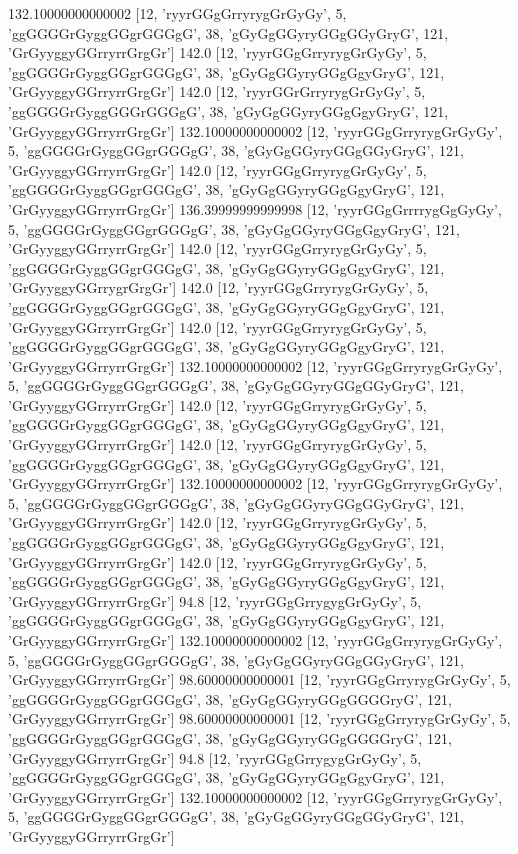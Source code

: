 132.10000000000002 [12, 'ryyrGGgGrryrygGrGyGy', 5, 'ggGGGGrGyggGGgrGGGgG', 38, 'gGyGgGGyryGGgGGyGryG', 121, 'GrGyyggyGGrryrrGrgGr']
142.0 [12, 'ryyrGGgGrryrygGrGyGy', 5, 'ggGGGGrGyggGGgrGGGgG', 38, 'gGyGgGGyryGGgGgyGryG', 121, 'GrGyyggyGGrryrrGrgGr']
142.0 [12, 'ryyrGGrGrryrygGrGyGy', 5, 'ggGGGGrGyggGGGrGGGgG', 38, 'gGyGgGGyryGGgGgyGryG', 121, 'GrGyyggyGGrryrrGrgGr']
132.10000000000002 [12, 'ryyrGGgGrryrygGrGyGy', 5, 'ggGGGGrGyggGGgrGGGgG', 38, 'gGyGgGGyryGGgGGyGryG', 121, 'GrGyyggyGGrryrrGrgGr']
142.0 [12, 'ryyrGGgGrryrygGrGyGy', 5, 'ggGGGGrGyggGGgrGGGgG', 38, 'gGyGgGGyryGGgGgyGryG', 121, 'GrGyyggyGGrryrrGrgGr']
136.39999999999998 [12, 'ryyrGGgGrrrrygGgGyGy', 5, 'ggGGGGrGyggGGgrGGGgG', 38, 'gGyGgGGyryGGgGgyGryG', 121, 'GrGyyggyGGrryrrGrgGr']
142.0 [12, 'ryyrGGgGrryrygGrGyGy', 5, 'ggGGGGrGyggGGgrGGGgG', 38, 'gGyGgGGyryGGgGgyGryG', 121, 'GrGyyggyGGrrygrGrgGr']
142.0 [12, 'ryyrGGgGrryrygGrGyGy', 5, 'ggGGGGrGyggGGgrGGGgG', 38, 'gGyGgGGyryGGgGgyGryG', 121, 'GrGyyggyGGrryrrGrgGr']
142.0 [12, 'ryyrGGgGrryrygGrGyGy', 5, 'ggGGGGrGyggGGgrGGGgG', 38, 'gGyGgGGyryGGgGgyGryG', 121, 'GrGyyggyGGrryrrGrgGr']
132.10000000000002 [12, 'ryyrGGgGrryrygGrGyGy', 5, 'ggGGGGrGyggGGgrGGGgG', 38, 'gGyGgGGyryGGgGGyGryG', 121, 'GrGyyggyGGrryrrGrgGr']
142.0 [12, 'ryyrGGgGrryrygGrGyGy', 5, 'ggGGGGrGyggGGgrGGGgG', 38, 'gGyGgGGyryGGgGgyGryG', 121, 'GrGyyggyGGrryrrGrgGr']
142.0 [12, 'ryyrGGgGrryrygGrGyGy', 5, 'ggGGGGrGyggGGgrGGGgG', 38, 'gGyGgGGyryGGgGgyGryG', 121, 'GrGyyggyGGrryrrGrgGr']
132.10000000000002 [12, 'ryyrGGgGrryrygGrGyGy', 5, 'ggGGGGrGyggGGgrGGGgG', 38, 'gGyGgGGyryGGgGGyGryG', 121, 'GrGyyggyGGrryrrGrgGr']
142.0 [12, 'ryyrGGgGrryrygGrGyGy', 5, 'ggGGGGrGyggGGgrGGGgG', 38, 'gGyGgGGyryGGgGgyGryG', 121, 'GrGyyggyGGrryrrGrgGr']
142.0 [12, 'ryyrGGgGrryrygGrGyGy', 5, 'ggGGGGrGyggGGgrGGGgG', 38, 'gGyGgGGyryGGgGgyGryG', 121, 'GrGyyggyGGrryrrGrgGr']
94.8 [12, 'ryyrGGgGrrygygGrGyGy', 5, 'ggGGGGrGyggGGgrGGGgG', 38, 'gGyGgGGyryGGgGgyGryG', 121, 'GrGyyggyGGrryrrGrgGr']
132.10000000000002 [12, 'ryyrGGgGrryrygGrGyGy', 5, 'ggGGGGrGyggGGgrGGGgG', 38, 'gGyGgGGyryGGgGGyGryG', 121, 'GrGyyggyGGrryrrGrgGr']
98.60000000000001 [12, 'ryyrGGgGrryrygGrGyGy', 5, 'ggGGGGrGyggGGgrGGGgG', 38, 'gGyGgGGyryGGgGGGGryG', 121, 'GrGyyggyGGrryrrGrgGr']
98.60000000000001 [12, 'ryyrGGgGrryrygGrGyGy', 5, 'ggGGGGrGyggGGgrGGGgG', 38, 'gGyGgGGyryGGgGGGGryG', 121, 'GrGyyggyGGrryrrGrgGr']
94.8 [12, 'ryyrGGgGrrygygGrGyGy', 5, 'ggGGGGrGyggGGgrGGGgG', 38, 'gGyGgGGyryGGgGgyGryG', 121, 'GrGyyggyGGrryrrGrgGr']
132.10000000000002 [12, 'ryyrGGgGrryrygGrGyGy', 5, 'ggGGGGrGyggGGgrGGGgG', 38, 'gGyGgGGyryGGgGGyGryG', 121, 'GrGyyggyGGrryrrGrgGr']
